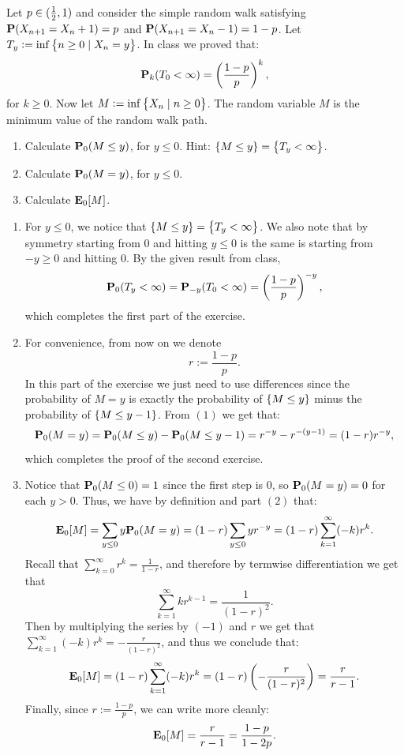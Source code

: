 \documentclass[11pt,a4paper]{article}
\begin{document}
\begin{exercise}
  Let $p \in (\frac{1}{2},1)$ and consider the simple random walk satisfying
  $\mathbf{P}(X_{n+1} = X_n + 1) = p$ and $\mathbf{P}(X_{n+1} = X_n - 1) = 1 - p$. 
  Let $T_y := \inf\left\{n \geq 0 \mid X_n = y\right\}$. 
  In class we proved that:
  \[
    \Prob_k(T_0 < \infty) =
    \del{\frac{1 - p}{p}}^k,
  \]
  for $k \geq 0$.
  Now let $M := \inf\left\{X_n \mid n \geq 0\right\}$.
  The random variable $M$ is the minimum value of the random walk path.
  \begin{enumerate}
    \item[(1)] Calculate $\mathbf{P}_0(M \le y)$, for $y \le 0$.
      Hint: $\left\{M \le y\right\} = \left\{T_y < \infty\right\}$.
    \item[(2)] Calculate $\mathbf{P}_0(M = y)$, for $y \le 0$.
    \item[(3)] Calculate $\mathbf{E}_0[M]$.
  \end{enumerate}
\end{exercise}
\begin{solution} \phantom{}
  \begin{enumerate}
    \item[(1)]
      For $y \le 0$, we notice that $\left\{M \le y\right\} = \left\{T_y < \infty\right\}$.
      We also note that by symmetry starting from $0$ and hitting $y \le 0$
      is the same is starting from $-y \geq 0$ and hitting $0$.
      By the given result from class,
      \[
        \Prob_0(T_y < \infty) =
        \Prob_{-y}(T_0 < \infty) = \del{\frac{1 - p}{p}}^{-y},
      \]
      which completes the first part of the exercise.
    \item[(2)] For convenience, from now on we denote
      \[
        r := \frac{1 - p}{p}.
      \]
      In this part of the exercise we just need to use differences
      since the probability of $M = y$ is exactly the probability
      of $\left\{M \le y\right\}$ minus the probability of $\left\{M \le y-1\right\}$.
      From $(1)$ we get that:
      \[
        \mathbf{P}_0(M = y) =
        \mathbf{P}_0(M \le y) - \mathbf{P}_0(M \le y - 1) =
        r^{-y} - r^{-(y - 1)} =
        (1 - r) r^{-y},
      \]
      which completes the proof of the second exercise.
    \item[(3)] Notice that $\mathbf{P}_0(M \le 0) = 1$
      since the first step is $0$,
      so $\mathbf{P}_0(M = y) = 0$ for each $y > 0$.
      Thus, we have by definition and part $(2)$ that:
      \[
        \mathbf{E}_0[M] =
        \sum_{y \le 0} y \mathbf{P}_0(M = y) =
        (1 - r) \sum_{y \le 0} y r^{-y} =
        (1 - r) \sum_{k=1}^{\infty} (-k) r^k.
      \]
      Recall that $\sum_{k=0}^{\infty} r^k = \frac{1}{1 - r}$,
      and therefore by termwise differentiation we get
      that
      \[
        \sum_{k=1}^{\infty} k r^{k-1} = \frac{1}{(1 - r)^2}.
      \]
      Then by multiplying the series by $(-1)$ and $r$
      we get that $\sum_{k=1}^{\infty} (-k) r^{k} = -\frac{r}{(1 - r)^2}$,
      and thus we conclude that:
      \[
        \E_0[M] =
        (1 - r) \sum_{k=1}^{\infty} (-k) r^k =
        (1 - r) \del{-\frac{r}{(1 - r)^2}} =
        \frac{r}{r - 1}.
      \]
      Finally, since $r := \frac{1 - p}{p}$, we can write more cleanly:
      \[
        \mathbf{E}_0[M] =
        \frac{r}{r - 1} =
        \frac{1 - p}{1 - 2p}.
      \]
  \end{enumerate}
\end{solution}
\end{document}
